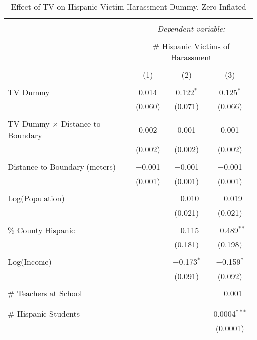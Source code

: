 
\begin{table}[!htbp] \centering 
  \caption{Effect of TV on Hispanic Victim Harassment Dummy, Zero-Inflated} 
  \label{} 
\begin{tabular}{@{\extracolsep{-2pt}}lccc} 
\\[-1.8ex]\hline 
\hline \\[-1.8ex] 
 & \multicolumn{3}{c}{\textit{Dependent variable:}} \\ 
\cline{2-4} 
\\[-1.8ex] & \multicolumn{3}{c}{\# Hispanic Victims of Harassment} \\ 
\\[-1.8ex] & (1) & (2) & (3)\\ 
\hline \\[-1.8ex] 
 TV Dummy & 0.014 & 0.122$^{*}$ & 0.125$^{*}$ \\ 
  & (0.060) & (0.071) & (0.066) \\ 
  & & & \\ 
 TV Dummy $\times$ Distance to Boundary & 0.002 & 0.001 & 0.001 \\ 
  & (0.002) & (0.002) & (0.002) \\ 
  & & & \\ 
 Distance to Boundary (meters) & $-$0.001 & $-$0.001 & $-$0.001 \\ 
  & (0.001) & (0.001) & (0.001) \\ 
  & & & \\ 
 Log(Population) &  & $-$0.010 & $-$0.019 \\ 
  &  & (0.021) & (0.021) \\ 
  & & & \\ 
 \% County Hispanic &  & $-$0.115 & $-$0.489$^{**}$ \\ 
  &  & (0.181) & (0.198) \\ 
  & & & \\ 
 Log(Income) &  & $-$0.173$^{*}$ & $-$0.159$^{*}$ \\ 
  &  & (0.091) & (0.092) \\ 
  & & & \\ 
 \# Teachers at School &  &  & $-$0.001 \\ 
  &  &  &  \\ 
  & & & \\ 
 \# Hispanic Students &  &  & 0.0004$^{***}$ \\ 
  &  &  & (0.0001) \\ 

\end{tabular}
\end{table}
